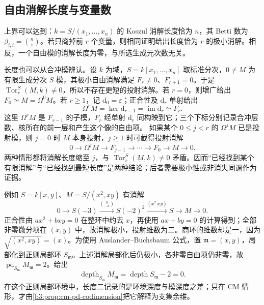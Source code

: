 \subsection{自由消解长度与变量数}
\label{b3:subsec:2102:03}

上界可以达到：\(k=S/(x_1,\ldots,x_n)\) 的 Koszul 消解长度恰为 \(n\)，其 Betti 数为 \(\beta_{i,i}=\binom ni\)。若只商掉前 \(r\) 个变量，则相同证明给出长度恰为 \(r\) 的极小消解。相反，一个自由模的消解长度为零，与所选生成元次数无关。

\ProseParagraphBreak
长度也可以从合冲模辨认。设 \(k\) 为域，\(S=k[x_1,\ldots,x_n]\) 取标准分次，\(0\ne M\) 为有限生成分次 \(S\) 模，其极小自由消解满足 \(F_r\ne0\)、\(F_{r+1}=0\)。于是 \(\operatorname{Tor}_r^S(M,k)\ne0\)，所以不存在更短的投射消解。若 \(r=0\)，则增广给出 \(F_0\simeq M=\Omega^0M\)。若 \(r\ge1\)，记 \(\mathrm{d}_0=\varepsilon\)；正合性及 \(\mathrm{d}_r\) 单射给出
\[
	\Omega^rM=\ker\mathrm{d}_{r-1} =\operatorname{im}\mathrm{d}_r\simeq F_r.
\]
这里 \(\Omega^rM\) 是 \(F_{r-1}\) 的子模，\(F_r\) 经单射 \(\mathrm{d}_r\) 同构映到它；三个下标分别记录合冲层数、核所在的前一层和产生这个像的自由项。 如果某个 \(0\le j<r\) 的 \(\Omega^jM\) 已是投射模，则 \(j=0\) 时 \(M\) 本身投射，\(j\ge1\) 时可截得投射消解
\[
	0\longrightarrow\Omega^jM\longrightarrow F_{j-1} \longrightarrow\cdots\longrightarrow F_0 \longrightarrow M\longrightarrow0.
\]
两种情形都将消解长度缩至 \(j\)，与 \(\operatorname{Tor}_r^S(M,k)\ne0\) 矛盾。因而“已经找到某个有限消解”与“已经找到最短长度”是两种结论；后者需要极小性或非消失同调作为证据。

\ProseParagraphBreak
例如 \(S=k[x,y]\)、\(M=S/(x^2,xy)\) 有消解
\[
	0\longrightarrow S(-3)\xrightarrow{\binom{y}{-x}}S(-2)^2 \xrightarrow{(x^2\ xy)}S\longrightarrow M\longrightarrow0.
\]
正合性由 \(ax^2+bxy=0\) 在整环中约去 \(x\)，再使用 \(ax+by=0\) 的计算得到；全部非零微分项在 \((x,y)\) 中，故消解极小，投射维数为二。商环的维数却是一，因为 \(\sqrt{(x^2,xy)}=(x)\)。为使用 Auslander--Buchsbaum 公式，置 \(\mathfrak m=(x,y)\)，局部化到正则局部环 \(S_{\mathfrak m}\)。上述消解局部化后仍极小，各非零自由项仍非零，故 \(\operatorname{pd}_{S_{\mathfrak m}}M_{\mathfrak m}=2\)。给出
\[
	\operatorname{depth}_{S_{\mathfrak m}}M_{\mathfrak m} =\operatorname{depth}S_{\mathfrak m}-2=0.
\]
在这个正则局部环境中，长度二记录的是环境深度与模深度之差；只在 CM 情形，才由\cref{b3:prop:cm-pd-codimension}把它解释为支集余维。

